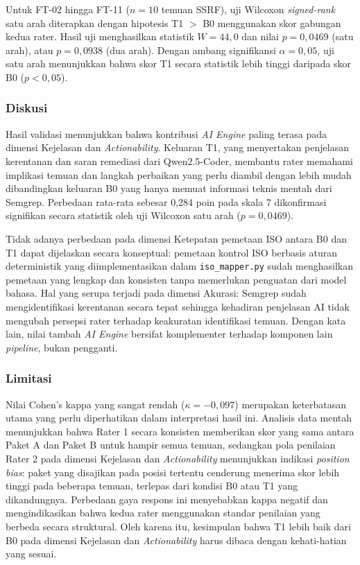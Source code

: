 Untuk FT-02 hingga FT-11 ($n = 10$ temuan SSRF), uji Wilcoxon
\textit{signed-rank} satu arah diterapkan dengan hipotesis T1 $>$
B0 menggunakan skor gabungan kedua rater. Hasil uji menghasilkan
statistik $W = 44{,}0$ dan nilai $p = 0{,}0469$ (satu arah), atau
$p = 0{,}0938$ (dua arah). Dengan ambang signifikansi $\alpha =
0{,}05$, uji satu arah menunjukkan bahwa skor T1 secara statistik
lebih tinggi daripada skor B0 ($p < 0{,}05$).

\subsubsection{Diskusi}

Hasil validasi menunjukkan bahwa kontribusi \textit{AI Engine}
paling terasa pada dimensi Kejelasan dan \textit{Actionability}.
Keluaran T1, yang menyertakan penjelasan kerentanan dan saran
remediasi dari Qwen2.5-Coder, membantu rater memahami implikasi
temuan dan langkah perbaikan yang perlu diambil dengan lebih mudah
dibandingkan keluaran B0 yang hanya memuat informasi teknis mentah
dari Semgrep. Perbedaan rata-rata sebesar 0,284 poin pada skala 7
dikonfirmasi signifikan secara statistik oleh uji Wilcoxon satu
arah ($p = 0{,}0469$).

Tidak adanya perbedaan pada dimensi Ketepatan pemetaan ISO antara
B0 dan T1 dapat dijelaskan secara konseptual: pemetaan kontrol ISO
berbasis aturan deterministik yang diimplementasikan dalam
\texttt{iso\_mapper.py} sudah menghasilkan pemetaan yang lengkap
dan konsisten tanpa memerlukan penguatan dari model bahasa. Hal
yang serupa terjadi pada dimensi Akurasi: Semgrep sudah
mengidentifikasi kerentanan secara tepat sehingga kehadiran
penjelasan AI tidak mengubah persepsi rater terhadap keakuratan
identifikasi temuan. Dengan kata lain, nilai tambah \textit{AI
Engine} bersifat komplementer terhadap komponen lain
\textit{pipeline}, bukan pengganti.

\subsubsection{Limitasi}

Nilai Cohen's kappa yang sangat rendah ($\kappa = {-0{,}097}$)
merupakan keterbatasan utama yang perlu diperhatikan dalam
interpretasi hasil ini. Analisis data mentah menunjukkan bahwa
Rater 1 secara konsisten memberikan skor yang sama antara Paket A
dan Paket B untuk hampir semua temuan, sedangkan pola penilaian
Rater 2 pada dimensi Kejelasan dan \textit{Actionability}
menunjukkan indikasi \textit{position bias}: paket yang disajikan
pada posisi tertentu cenderung menerima skor lebih tinggi pada
beberapa temuan, terlepas dari kondisi B0 atau T1 yang dikandungnya.
Perbedaan gaya respons ini menyebabkan kappa negatif dan
mengindikasikan bahwa kedua rater menggunakan standar penilaian
yang berbeda secara struktural. Oleh karena itu, kesimpulan bahwa
T1 lebih baik dari B0 pada dimensi Kejelasan dan
\textit{Actionability} harus dibaca dengan kehati-hatian yang sesuai.

